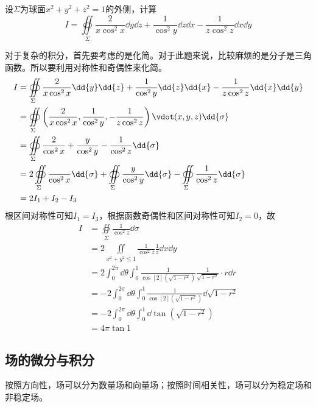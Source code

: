 \begin{example}
    设$\Sigma$为球面$x^2+y^2+z^2=1$的外侧，计算
    \[ I = \oiint\limits_\Sigma \frac{2}{x\cos^2 x}\dd{y}\dd{z} + \frac{1}{\cos^2 y}\dd{z}\dd{x} - \frac{1}{z\cos^2 z}\dd{x}\dd{y} \]
\end{example}
\begin{solution}
    对于复杂的积分，首先要考虑的是化简。对于此题来说，比较麻烦的是分子是三角函数。所以要利用对称性和奇偶性来化简。
    \begin{align*}
        I & = \oiint\limits_\Sigma \frac{2}{x\cos^2 x}\dd{y}\dd{z} + \frac{1}{\cos^2 y}\dd{z}\dd{x} - \frac{1}{z\cos^2 z}\dd{x}\dd{y}                                        \\
          & = \oiint\limits_\Sigma \left(\frac{2}{x\cos^2 x} , \frac{1}{\cos^2 y} , -\frac{1}{z\cos^2 z}\right)\vdot(x,y,z)\dd{\sigma}                                       \\
          & = \oiint\limits_\Sigma \frac{2}{\cos^2 x} + \frac{y}{\cos^2 y} - \frac{1}{\cos^2 z} \dd{\sigma}                                                                  \\
          & = 2\oiint\limits_\Sigma \frac{}{\cos^2 x} \dd{\sigma} + \oiint\limits_\Sigma \frac{y}{\cos^2 y} \dd{\sigma} -\oiint\limits_\Sigma \frac{1}{\cos^2 z} \dd{\sigma} \\
          & = 2I_1 + I_2 - I_3
    \end{align*}
    根区间对称性可知$I_1 = I_3$，根据函数奇偶性和区间对称性可知$I_2=0$，故
    \begin{align*}
        I & = \oiint\limits_\Sigma \frac{1}{\cos^2 z} \dd{\sigma}                                                      \\
          & = 2\iint\limits_{x^2+y^2\leq 1} \frac{1}{\cos^2 z}\frac{1}{z}\dd{x}\dd{y}                                  \\
          & = 2\int_0^{2\pi} \dd{\theta} \int_0^1 \frac{1}{\cos[2](\sqrt{1-r^2})} \frac{1}{\sqrt{1-r^2}}\cdot r \dd{r} \\
          & = -2\int_0^{2\pi} \dd{\theta}\int_0^1 \frac{1}{\cos[2](\sqrt{1-r^2})} \dd{\sqrt{1-r^2}}                    \\
          & = -2\int_0^{2\pi} \dd{\theta}\int_0^1  \dd{\tan(\sqrt{1-r^2})}                                             \\
          & = 4\pi\tan 1
    \end{align*}
\end{solution}

\subsection{场的微分与积分}
按照方向性，场可以分为数量场和向量场；按照时间相关性，场可以分为稳定场和非稳定场。

